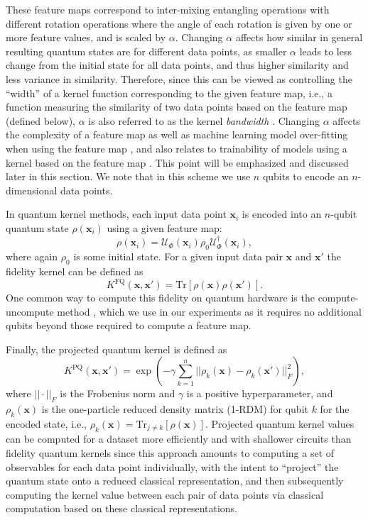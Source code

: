 \documentclass[reprint,amsfonts, amssymb, amsmath,  showkeys, nofootinbib,pra, superscriptaddress, twocolumn,longbibliography]{revtex4-2}
\renewcommand{\vec}[1]{\boldsymbol{#1}}  %
\begin{document}
These feature maps correspond to inter-mixing entangling operations with different rotation operations where the angle of each rotation is given by one or more feature values, and is scaled by $\alpha$. Changing $\alpha$ affects how  similar in general resulting quantum states are for different data points, as smaller $\alpha$ leads to less change from the initial state for all data points, and thus higher similarity and less variance in similarity.  Therefore, since this can be viewed as controlling the ``width'' of a kernel function corresponding to the given feature map, i.e., a function measuring the similarity of two data points based on the feature map (defined below), $\alpha$ is also referred to as the kernel \emph{bandwidth} \cite{shaydulin2022importance}.  
 Changing $\alpha$ affects the complexity of a feature map as well as machine learning model over-fitting when using the feature map \cite{Park2020practical}, and also relates to trainability of models using a kernel based on the feature map \cite{shaydulin2022importance}. This point will be emphasized and discussed later in this section.
We note that in this scheme we use $n$ qubits to encode an $n$-dimensional data points. 

In quantum kernel methods, each input data point $\vec{x}_i$ is encoded into an $n$-qubit quantum state $\rho(\vec{x}_i)$ using a given feature map: 
\begin{equation}
  \label{eq:density_matrix}
  \rho(\vec{x}_i)=\mathcal{U}_{\Phi}(\vec{x}_i)\rho_0 \mathcal{U}_{\Phi}^\dag (\vec{x}_i),
\end{equation}
where again $\rho_0$ is some initial state.
For a given input data pair $\vec{x}$ and $\vec{x}'$ the fidelity kernel can be defined as
\begin{equation}
  \label{eq:fq-kernel}
  K^{\text{FQ}}(\vec{x},\vec{x}')=\text{Tr}\left[ \rho(\vec{x})\rho(\vec{x}') \right].
\end{equation}
One common way to compute this fidelity on quantum hardware is the compute-uncompute method \cite{havlivcek2019supervised}, which we use in our experiments as it requires no additional qubits beyond those required to compute a feature map.  

Finally, the projected quantum kernel \cite{Huang2021} is defined as
\begin{equation}
  \label{eq:pq-kernel}
  K^{\text{PQ}}(\vec{x},\vec{x}')=\exp
  \left( -\gamma\sum_{k=1}^n || \rho_k(\vec{x})-\rho_k(\vec{x}') ||_F^2 \right)
  ,
\end{equation}
where $||\cdot ||_F$ is the Frobenius norm and $\gamma$ is a positive hyperparameter, and $\rho_k(\vec{x})$ is the one-particle reduced density matrix (1-RDM) for qubit $k$ for the encoded state, i.e., $\rho_k(\vec{x}) = \text{Tr}_{j \neq k}\left[ \rho(\vec{x}) \right]$.  Projected quantum kernel values can be computed for a dataset more efficiently and with shallower circuits than fidelity quantum kernels since this approach amounts to computing a set of observables for each data point individually, with the intent to ``project'' the quantum state onto a reduced classical representation, and then subsequently computing the kernel value between each pair of data points via classical computation based on these classical representations. 
\end{document}
